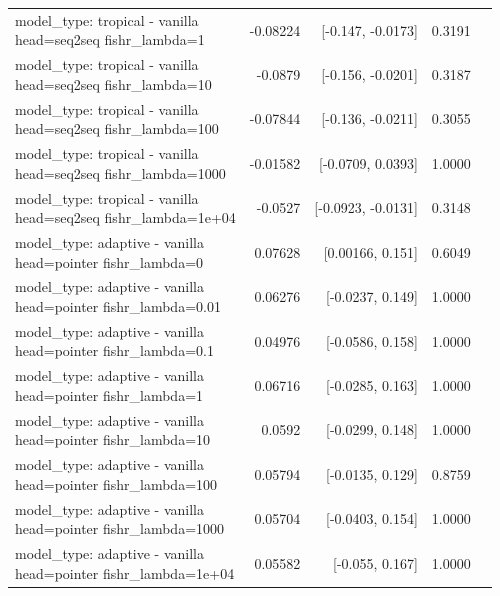 \documentclass[10pt]{article}
\makeatletter
\newcommand{\stackcell}[1]{\begin{tabular}[t]{@{}l@{}}#1\end{tabular}}
\makeatother
\begin{document}
{\begin{longtable}{lrrrl}
\stackcell{model\_type: tropical - vanilla\\\footnotesize head=seq2seq fishr\_lambda=1 } & -0.08224 & [-0.147, -0.0173] & 0.3191 & \\
\stackcell{model\_type: tropical - vanilla\\\footnotesize head=seq2seq fishr\_lambda=10 } & -0.0879 & [-0.156, -0.0201] & 0.3187 & \\
\stackcell{model\_type: tropical - vanilla\\\footnotesize head=seq2seq fishr\_lambda=100 } & -0.07844 & [-0.136, -0.0211] & 0.3055 & \\
\stackcell{model\_type: tropical - vanilla\\\footnotesize head=seq2seq fishr\_lambda=1000 } & -0.01582 & [-0.0709, 0.0393] & 1.0000 & \\
\stackcell{model\_type: tropical - vanilla\\\footnotesize head=seq2seq fishr\_lambda=1e+04 } & -0.0527 & [-0.0923, -0.0131] & 0.3148 & \\
\stackcell{model\_type: adaptive - vanilla\\\footnotesize head=pointer fishr\_lambda=0 } & 0.07628 & [0.00166, 0.151] & 0.6049 & \\
\stackcell{model\_type: adaptive - vanilla\\\footnotesize head=pointer fishr\_lambda=0.01 } & 0.06276 & [-0.0237, 0.149] & 1.0000 & \\
\stackcell{model\_type: adaptive - vanilla\\\footnotesize head=pointer fishr\_lambda=0.1 } & 0.04976 & [-0.0586, 0.158] & 1.0000 & \\
\stackcell{model\_type: adaptive - vanilla\\\footnotesize head=pointer fishr\_lambda=1 } & 0.06716 & [-0.0285, 0.163] & 1.0000 & \\
\stackcell{model\_type: adaptive - vanilla\\\footnotesize head=pointer fishr\_lambda=10 } & 0.0592 & [-0.0299, 0.148] & 1.0000 & \\
\stackcell{model\_type: adaptive - vanilla\\\footnotesize head=pointer fishr\_lambda=100 } & 0.05794 & [-0.0135, 0.129] & 0.8759 & \\
\stackcell{model\_type: adaptive - vanilla\\\footnotesize head=pointer fishr\_lambda=1000 } & 0.05704 & [-0.0403, 0.154] & 1.0000 & \\
\stackcell{model\_type: adaptive - vanilla\\\footnotesize head=pointer fishr\_lambda=1e+04 } & 0.05582 & [-0.055, 0.167] & 1.0000 & \\

\end{longtable}}
\end{document}
